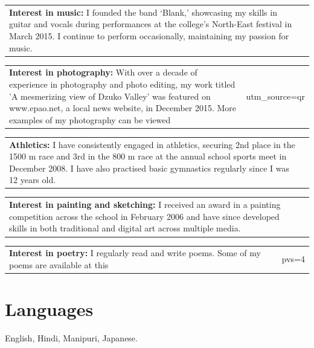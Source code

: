 \documentclass[margin,line]{res}
\begin{document}
\begin{resume}
\begin{tabular}{@{}p{\dimexpr\linewidth-0.62in-3\tabcolsep\relax}p{0.62in}}
{\bf Interest in music:} I founded the band ‘Blank,’ showcasing my skills in guitar and vocals during performances at the college's North-East festival in March 2015. I continue to perform occasionally, maintaining my passion for music.
\end{tabular}

\begin{tabular}{@{}p{\dimexpr\linewidth-0.62in-3\tabcolsep\relax}p{0.62in}}
{\bf Interest in photography:} With over a decade of experience in photography and photo editing, my work titled 'A mesmerizing view of Dzuko Valley' was featured on www.epao.net, a local news website, in December 2015. More examples of my photography can be viewed \href{https://www.instagram.com/ethil_lens?igsh=b215aWQ1ODrxMzl5&utm_source=qr}{here}.
\end{tabular}

\begin{tabular}{@{}p{\dimexpr\linewidth-0.62in-3\tabcolsep\relax}p{0.62in}}
{\bf Athletics:} I have consistently engaged in athletics, securing 2nd place in the 1500 m race and 3rd in the 800 m race at the annual school sports meet in December 2008. I have also practised basic gymnastics regularly since I was 12 years old.
\end{tabular}

\begin{tabular}{@{}p{\dimexpr\linewidth-0.62in-3\tabcolsep\relax}p{0.62in}}
{\bf Interest in painting and sketching:} I received an award in a painting competition across the school in February 2006 and have since developed skills in both traditional and digital art across multiple media.
\end{tabular}

\begin{tabular}{@{}p{\dimexpr\linewidth-0.62in-3\tabcolsep\relax}p{0.62in}}
{\bf Interest in poetry:} I regularly read and write poems. Some of my poems are available at this \href{https://hemantaph.notion.site/da1c78ed00cb4dd2820ba59787be18ee?v=32fd4a98621147209522f8f469081527&pvs=4}{[link]}.
\end{tabular}

\section{\sc Languages}
English, Hindi, Manipuri, Japanese.



\end{resume}
\end{document}
